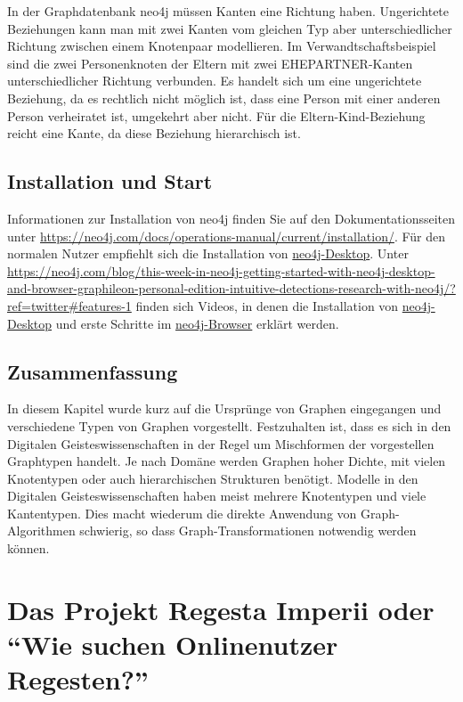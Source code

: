 \documentclass[ngerman,]{scrreprt}
\begin{document}
In der Graphdatenbank neo4j müssen Kanten eine Richtung haben. Ungerichtete Beziehungen kann man mit zwei Kanten vom gleichen Typ aber unterschiedlicher Richtung zwischen einem Knotenpaar modellieren. Im Verwandtschaftsbeispiel sind die zwei Personenknoten der Eltern mit zwei EHEPARTNER-Kanten unterschiedlicher Richtung verbunden. Es handelt sich um eine ungerichtete Beziehung, da es rechtlich nicht möglich ist, dass eine Person mit einer anderen Person verheiratet ist, umgekehrt aber nicht. Für die Eltern-Kind-Beziehung reicht eine Kante, da diese Beziehung hierarchisch ist.

\hypertarget{installation-und-start}{%
\section{Installation und Start}\label{installation-und-start}}

Informationen zur Installation von neo4j finden Sie auf den Dokumentationsseiten unter \url{https://neo4j.com/docs/operations-manual/current/installation/}. Für den normalen Nutzer empfiehlt sich die Installation von \href{https://neo4j.com/download/}{neo4j-Desktop}. Unter \url{https://neo4j.com/blog/this-week-in-neo4j-getting-started-with-neo4j-desktop-and-browser-graphileon-personal-edition-intuitive-detections-research-with-neo4j/?ref=twitter\#features-1} finden sich Videos, in denen die Installation von \href{https://www.youtube.com/watch?v=8yWhuUnPapw}{neo4j-Desktop} und erste Schritte im \href{https://www.youtube.com/watch?v=rQTximyaETA}{neo4j-Browser} erklärt werden.

\hypertarget{zusammenfassung}{%
\section{Zusammenfassung}\label{zusammenfassung}}

In diesem Kapitel wurde kurz auf die Ursprünge von Graphen eingegangen und verschiedene Typen von Graphen vorgestellt. Festzuhalten ist, dass es sich in den Digitalen Geisteswissenschaften in der Regel um Mischformen der vorgestellen Graphtypen handelt. Je nach Domäne werden Graphen hoher Dichte, mit vielen Knotentypen oder auch hierarchischen Strukturen benötigt. Modelle in den Digitalen Geisteswissenschaften haben meist mehrere Knotentypen und viele Kantentypen. Dies macht wiederum die direkte Anwendung von Graph-Algorithmen schwierig, so dass Graph-Transformationen notwendig werden können.

\hypertarget{das-projekt-regesta-imperii-oder-wie-suchen-onlinenutzer-regesten}{%
\chapter{Das Projekt Regesta Imperii oder ``Wie suchen Onlinenutzer Regesten?''}\label{das-projekt-regesta-imperii-oder-wie-suchen-onlinenutzer-regesten}}
\end{document}
